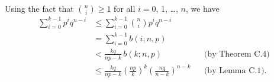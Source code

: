 \starred
Using the fact that $\binom{n}{i}\ge1$ for all $i=0$, 1, \dots, $n$, we have
\begin{align*}
    \sum_{i=0}^{k-1}p^iq^{n-i} &\le \sum_{i=0}^{k-1}\binom{n}{i}p^iq^{n-i} \\
    &= \sum_{i=0}^{k-1}b(i;n,p) \\
    &< \frac{kq}{np-k}\,b(k;n,p) && \text{(by Theorem C.4)} \\
    &\le \frac{kq}{np-k}\left(\frac{np}{k}\right)^k\left(\frac{nq}{n-k}\right)^{n-k} && \text{(by Lemma C.1)}.
\end{align*}
